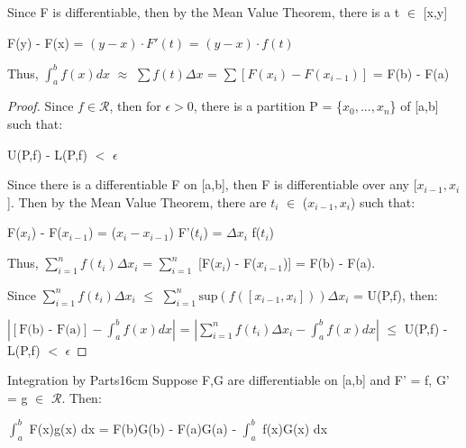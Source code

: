     \begin{intuition}
        Since F is differentiable, then by the Mean Value Theorem,
        there is a t $\in$ [x,y]

        \hspace{0.5cm}
        F(y) - F(x)
        = $(y-x) \cdot F'(t)$
        = $(y-x) \cdot f(t)$

        Thus, $\int_a^b f(x) dx$
        $\approx$ $\sum f(t) \Delta x$
        = $\sum [F(x_i) - F(x_{i-1})]$
        = F(b) - F(a)
    \end{intuition}

    \vspace{0.1cm}

    \begin{proof}
        Since $f \in \mathscr{R}$, then for $\epsilon > 0$, there is a 
        partition P = \{$x_0,...,x_n$\} of [a,b] such that:

        \hspace{0.5cm}
        U(P,f) - L(P,f) $<$ $\epsilon$

        Since there is a differentiable F on [a,b], then F is differentiable over
        any [$x_{i-1},x_i$].
        Then by the Mean Value Theorem, there are $t_i$ $\in$ ($x_{i-1},x_i$)
        such that:

        \hspace{0.5cm}
        F($x_i$) - F($x_{i-1}$)
        = ($x_i - x_{i-1}$) F'($t_i$)
        = $\Delta x_i$ f($t_i$)

        Thus,
        $\sum_{i=1}^n f(t_i) \Delta x_i$
        = $\sum_{i=1}^n$ [F($x_i$) - F($x_{i-1}$)]
        = F(b) - F(a).

        Since $\sum_{i=1}^n f(t_i) \Delta x_i$
        $\leq$ $\sum_{i=1}^n \text{sup}(f([x_{i-1},x_i])) \Delta x_i$
        = U(P,f), then:

        \hspace{0.5cm}
        $| [\text{F(b) - F(a)}] - \int_a^b f(x) dx |$
        = $|\sum_{i=1}^n f(t_i) \Delta x_i - \int_a^b f(x) dx|$
        $\leq$ U(P,f) - L(P,f) $<$ $\epsilon$        
    \end{proof}

    \vspace{0.5cm}



    \begin{wtheorem}{Integration by Parts}{16cm}
        Suppose F,G are differentiable on [a,b] and
        F' = f, G' = g $\in$ $\mathscr{R}$. Then:

        \hspace{0.5cm}
        $\int_a^b$ F(x)g(x) dx
        = F(b)G(b) - F(a)G(a) - $\int_a^b$ f(x)G(x) dx        
    \end{wtheorem}

